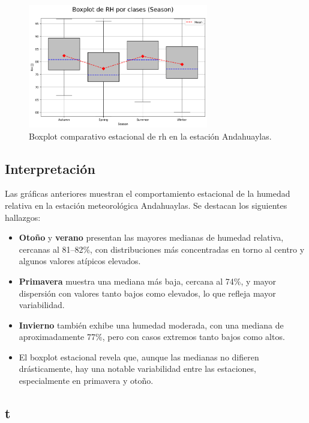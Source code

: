 \vspace{0.2cm}

\begin{figure}[htbp]
\centering
\includegraphics[width=0.7\textwidth]{resultados/por_estacion_del_anio/boxplot_clases_por_estacion/Andahuaylas/RH_ClassBoxplot_Season.png}
\caption{Boxplot comparativo estacional de \gls{rh}  en la estación Andahuaylas.}
\label{fig:andahuaylas_rh_box}
\end{figure}

\subsection*{Interpretación}

Las gráficas anteriores muestran el comportamiento estacional de la humedad relativa en la estación meteorológica Andahuaylas. Se destacan los siguientes hallazgos:

\begin{itemize}
    \item \textbf{Otoño} y \textbf{verano} presentan las mayores medianas de humedad relativa, cercanas al 81--82\%, con distribuciones más concentradas en torno al centro y algunos valores atípicos elevados.
    \item \textbf{Primavera} muestra una mediana más baja, cercana al 74\%, y mayor dispersión con valores tanto bajos como elevados, lo que refleja mayor variabilidad.
    \item \textbf{Invierno} también exhibe una humedad moderada, con una mediana de aproximadamente 77\%, pero con casos extremos tanto bajos como altos.
    \item El boxplot estacional revela que, aunque las medianas no difieren drásticamente, hay una notable variabilidad entre las estaciones, especialmente en primavera y otoño.
\end{itemize}


\subsection{\gls{t} }

